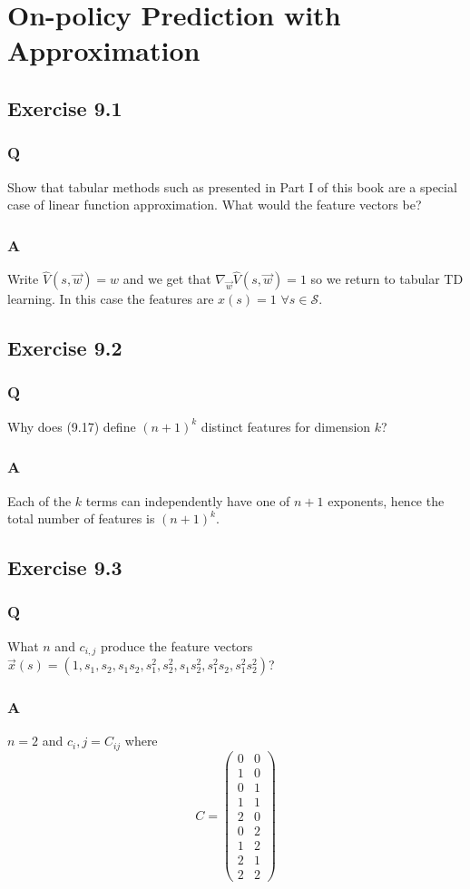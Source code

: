 \section{On-policy Prediction with Approximation}

\subsection{Exercise 9.1}
\subsubsection{Q}
Show that tabular methods such as presented in Part I of this book are a special case of linear function approximation. What would the feature vectors be?
\subsubsection{A}
Write $\hat{V}(s, \vec{w}) = w$ and we get that $\nabla_\vec{w} \hat{V}(s, \vec{w}) = 1$ so we return to tabular TD learning. In this case the features are $x(s) = 1$ $\forall s \in \mathcal{S}$.

\subsection{Exercise 9.2}
\subsubsection{Q}
Why does (9.17) define $(n+1)^k$ distinct features for dimension $k$?
\subsubsection{A}
Each of the $k$ terms can independently have one of $n+1$ exponents, hence the total number of features is $(n+1)^k$.

\subsection{Exercise 9.3}
\subsubsection{Q}
What $n$ and $c_{i,j}$ produce the feature vectors $\vec{x}(s) = (1, s_1, s_2, s_1s_2, s_1^2, s_2^2, s_1s_2^2, s_1^2 s_2, s_1^2 s_2^2)$?
\subsubsection{A}
$n=2$ and $c_i, j = C_{ij}$ where
\[
C =
\begin{pmatrix}
    0 & 0 \\
    1 & 0 \\
    0 & 1 \\
    1 & 1 \\
    2 & 0 \\
    0 & 2 \\
    1 & 2 \\
    2 & 1 \\
    2 & 2
\end{pmatrix}
\]

